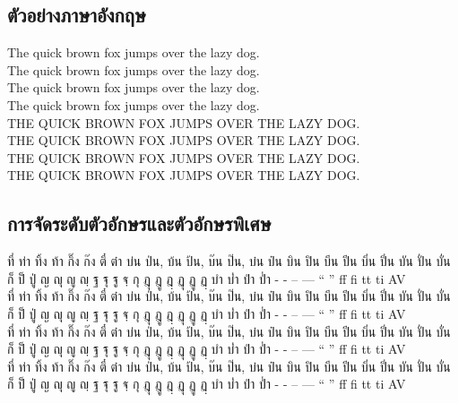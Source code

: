 \documentclass[twocolumn,a4paper]{article}
\begin{document}
\subsection{ตัวอย่างภาษาอังกฤษ}
The quick brown fox jumps over the lazy dog.\\
The quick brown fox jumps over the lazy dog.\\
The quick brown fox jumps over the lazy dog.\\
The quick brown fox jumps over the lazy dog.\\
\MakeUppercase{The quick brown fox jumps over the lazy dog.}\\
\MakeUppercase{The quick brown fox jumps over the lazy dog.}\\
\MakeUppercase{The quick brown fox jumps over the lazy dog.}\\
\MakeUppercase{The quick brown fox jumps over the lazy dog.}\\


\subsection{การจัดระดับตัวอักษรและตัวอักษรพิเศษ}
\noindent
{}
ที่ ท่า ทิ้ง ท้า กิ๊ง ก๊ง ตี๋ ต๋า บ่น ป่น, บ้น ป้น, บ๊น ป๊น, บ๋น ป๋น บิน ปิน บีน ปีน บิ่น ปิ่น บัน ปั่น บั่น ก็ ป็ ปู่ ญ ญุ ญู ญฺ ฐ ฐุ ฐู ฐฺ กุ ฎุ ฎู ฎฺ ฏุ ฏู ฏฺ บำ บ่ำ ปำ ป่ำ -\textyamakkan{} \textfongmun{} \textangkhankhu{} \textkhomut{} - -- --- `` '' ff fi tt ti AV\\
ที่ ท่า ทิ้ง ท้า กิ๊ง ก๊ง ตี๋ ต๋า บ่น ป่น, บ้น ป้น, บ๊น ป๊น, บ๋น ป๋น บิน ปิน บีน ปีน บิ่น ปิ่น บัน ปั่น บั่น ก็ ป็ ปู่ ญ ญุ ญู ญฺ ฐ ฐุ ฐู ฐฺ กุ ฎุ ฎู ฎฺ ฏุ ฏู ฏฺ บำ บ่ำ ปำ ป่ำ -\textyamakkan{} \textfongmun{} \textangkhankhu{} \textkhomut{} - -- --- `` '' ff fi tt ti AV\\
ที่ ท่า ทิ้ง ท้า กิ๊ง ก๊ง ตี๋ ต๋า บ่น ป่น, บ้น ป้น, บ๊น ป๊น, บ๋น ป๋น บิน ปิน บีน ปีน บิ่น ปิ่น บัน ปั่น บั่น ก็ ป็ ปู่ ญ ญุ ญู ญฺ ฐ ฐุ ฐู ฐฺ กุ ฎุ ฎู ฎฺ ฏุ ฏู ฏฺ บำ บ่ำ ปำ ป่ำ -\textyamakkan{} \textfongmun{} \textangkhankhu{} \textkhomut{} - -- --- `` '' ff fi tt ti AV\\
ที่ ท่า ทิ้ง ท้า กิ๊ง ก๊ง ตี๋ ต๋า บ่น ป่น, บ้น ป้น, บ๊น ป๊น, บ๋น ป๋น บิน ปิน บีน ปีน บิ่น ปิ่น บัน ปั่น บั่น ก็ ป็ ปู่ ญ ญุ ญู ญฺ ฐ ฐุ ฐู ฐฺ กุ ฎุ ฎู ฎฺ ฏุ ฏู ฏฺ บำ บ่ำ ปำ ป่ำ -\textyamakkan{} \textfongmun{} \textangkhankhu{} \textkhomut{} - -- --- `` '' ff fi tt ti AV\\
\end{document}
